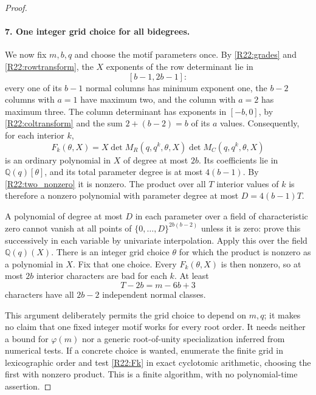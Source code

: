 \documentclass[11pt,a4paper]{article}
\theoremstyle{definition}\newtheorem{definition}{Definition}
\begin{document}
\begin{proof}
\paragraph{7. One integer grid choice for all bidegrees.}
We now fix $m,b,q$ and choose the motif parameters once.
By \eqref{R22:grades} and \eqref{R22:rowtransform}, the $X$ exponents
of the row determinant lie in
\[
 [b-1,2b-1]:
\]
every one of its $b-1$ normal columns has minimum exponent one,
the $b-2$ columns with $a=1$ have maximum two, and the column with
$a=2$ has maximum three. The column determinant has exponents in
$[-b,0]$, by \eqref{R22:coltransform} and the sum
$2+(b-2)=b$ of its $a$ values. Consequently, for each interior $k$,
\begin{equation}\label{R22:Fk}
 F_k(\theta,X)=X\det M_R(q,q^k,\theta,X)
                    \det M_C(q,q^k,\theta,X)
\end{equation}
is an ordinary polynomial in $X$ of degree at most $2b$.
Its coefficients lie in $\mathbb Q(q)[\theta]$, and its total
parameter degree is at most $4(b-1)$. By
\eqref{R22:two_nonzero} it is nonzero. The product over all $T$
interior values of $k$ is therefore a nonzero polynomial with
parameter degree at most $D=4(b-1)T$.

A polynomial of degree at most $D$ in each parameter over a field
of characteristic zero
cannot vanish at all points of $\{0,\ldots,D\}^{2b(b-2)}$ unless
it is zero: prove this successively in each variable by univariate
interpolation. Apply this over the field $\mathbb Q(q)(X)$.
There is an integer grid choice $\theta$ for which the product is
nonzero as a polynomial in $X$. Fix that one choice. Every
$F_k(\theta,X)$ is then nonzero, so at most $2b$ interior characters
are bad for each $k$. At least
\begin{equation}\label{R22:good_modes}
 T-2b=m-6b+3
\end{equation}
characters have all $2b-2$ independent normal classes.

This argument deliberately permits the grid choice to depend on
$m,q$; it makes no claim that one fixed integer motif works for
every root order. It needs neither a bound for $\varphi(m)$ nor a
generic root-of-unity specialization inferred from numerical tests.
If a concrete choice is wanted, enumerate the finite grid in
lexicographic order and test \eqref{R22:Fk} in exact cyclotomic
arithmetic, choosing the first with nonzero product. This is a finite
algorithm, with no polynomial-time assertion.


\end{proof}
\end{document}
